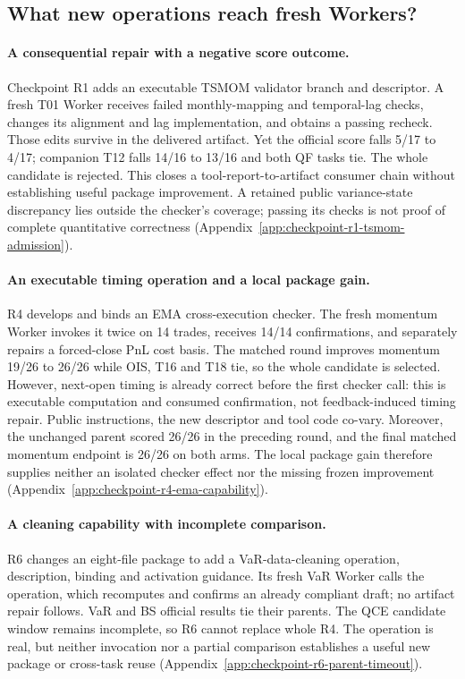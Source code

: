 \subsection{What new operations reach fresh Workers?}

\paragraph{A consequential repair with a negative score outcome.}
Checkpoint R1 adds an executable TSMOM validator branch and descriptor.
A fresh T01 Worker receives failed monthly-mapping and temporal-lag checks,
changes its alignment and lag implementation, and obtains a passing recheck.
Those edits survive in the delivered artifact. Yet the official score falls
5/17 to 4/17; companion T12 falls 14/16 to 13/16 and both QF tasks tie.
The whole candidate is rejected. This closes a tool-report-to-artifact
consumer chain without establishing useful package improvement. A retained
public variance-state discrepancy lies outside the checker's coverage;
passing its checks is not proof of complete quantitative correctness
(Appendix~\ref{app:checkpoint-r1-tsmom-admission}).

\paragraph{An executable timing operation and a local package gain.}
R4 develops and binds an EMA cross-execution checker. The fresh momentum
Worker invokes it twice on 14 trades, receives 14/14 confirmations, and
separately repairs a forced-close PnL cost basis. The matched round improves
momentum 19/26 to 26/26 while OIS, T16 and T18 tie, so the whole candidate is
selected. However, next-open timing is already correct before the first
checker call: this is executable computation and consumed confirmation, not
feedback-induced timing repair. Public instructions, the new descriptor and
tool code co-vary. Moreover, the unchanged parent scored 26/26 in the preceding
round, and the final matched momentum endpoint is 26/26 on both arms.
The local package gain therefore supplies neither an isolated checker effect
nor the missing frozen improvement
(Appendix~\ref{app:checkpoint-r4-ema-capability}).

\paragraph{A cleaning capability with incomplete comparison.}
R6 changes an eight-file package to add a VaR-data-cleaning operation,
description, binding and activation guidance. Its fresh VaR Worker calls the
operation, which recomputes and confirms an already compliant draft; no
artifact repair follows. VaR and BS official results tie their parents.
The QCE candidate window remains incomplete, so R6 cannot replace whole R4.
The operation is real, but neither invocation nor a partial comparison
establishes a useful new package or cross-task reuse
(Appendix~\ref{app:checkpoint-r6-parent-timeout}).


